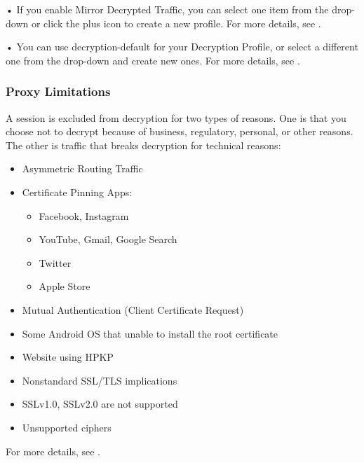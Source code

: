 • If you enable Mirror Decrypted Traffic, you can select one item from the drop-down or click the plus icon to create a new profile. For more details, see \hyperlink{link:Traffic Mirror Profile}{\color{linkblue}{Traffic Mirror Profile}}.


• You can use decryption-default for your Decryption Profile, or select a different one from the drop-down and create new ones. For more details, see \hyperlink{link:Decryption Profile}{\color{linkblue}{Decryption Profile}}.

\subsubsection*{\hypertarget{link:Proxy Limitations}{Proxy Limitations}}
\label{sec:policies:security:intercept:limitation}

A session is excluded from decryption for two types of reasons. One is that you choose not to decrypt because of business, regulatory, personal, or other reasons. The other is traffic that breaks decryption for technical reasons:


\begin{itemize}
    \item Asymmetric Routing Traffic 
    \item Certificate Pinning Apps:
    \begin{itemize}
        \item[-] Facebook, Instagram
        \item[-] YouTube, Gmail, Google Search
        \item[-] Twitter
        \item[-] Apple Store   
    \end{itemize} 
    \item Mutual Authentication (Client Certificate Request) 
    \item Some Android OS that unable to install the root certificate
    \item Website using HPKP
    \item Nonstandard SSL/TLS implications
    \item SSLv1.0, SSLv2.0 are not supported
    \item Unsupported ciphers          
\end{itemize}
For more details, see \hyperlink{link:SSL Decryption Exclulsion}{\color{linkblue}{SSL Decryption Exclulsion}}.


